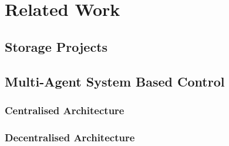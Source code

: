 \section{Related Work}
\label{ch-review:sec:related-work}

\subsection{Storage Projects}

\subsection{Multi-Agent System Based Control}

\subsubsection{Centralised Architecture}

\subsubsection{Decentralised Architecture}


%
%
%
%
%